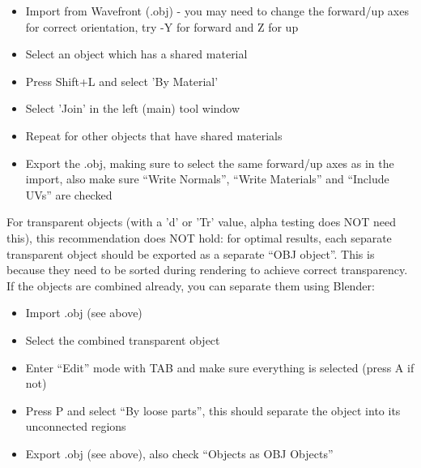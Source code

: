 \documentclass[a4paper]{article}
\begin{document}
\begin{itemize}
\item Import from Wavefront (.obj) - you may need to change the forward/up axes for correct orientation, try -Y for forward and Z for up
\item Select an object which has a shared material
\item Press Shift+L and select 'By Material'
\item Select 'Join' in the left (main) tool window
\item Repeat for other objects that have shared materials
\item Export the .obj, making sure to select the same forward/up axes as in the import, also make sure ``Write Normals'', ``Write Materials'' and ``Include UVs'' are checked
\end{itemize}

For transparent objects (with a 'd' or 'Tr' value, alpha testing does NOT need this), this recommendation does NOT hold: for optimal results, each separate transparent object should be exported as a separate ``OBJ object''. This is because they need to be sorted during rendering to achieve correct transparency. If the objects are combined already, you can separate them using Blender:

\begin{itemize}
\item Import .obj (see above)
\item Select the combined transparent object
\item Enter ``Edit'' mode with TAB and make sure everything is selected (press A if not)
\item Press P and select ``By loose parts'', this should separate the object into its unconnected regions
\item Export .obj (see above), also check ``Objects as OBJ Objects''
\end{itemize}
\end{document}
